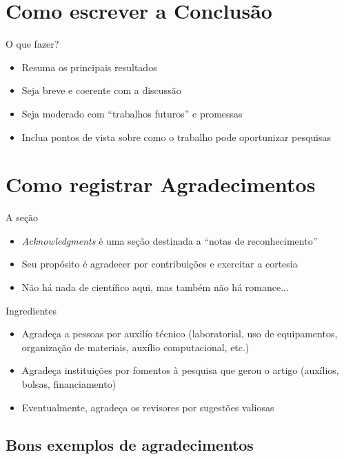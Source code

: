 \section{Como escrever a Conclusão}

\begin{frame}{O que fazer?}
\begin{itemize}
\item Resuma os principais resultados 
\item Seja breve e coerente com a discussão
\item Seja moderado com ``trabalhos futuros'' e promessas
\item Inclua pontos de vista sobre como o trabalho pode oportunizar pesquisas
\end{itemize}
\end{frame}


\section{Como registrar Agradecimentos}

\begin{frame}{A seção}
\begin{itemize}
\item \emph{Acknowledgments} é uma seção destinada a ``notas de reconhecimento''
\item Seu propósito é agradecer por contribuições e exercitar a cortesia
\item Não há nada de científico aqui, mas também não há romance... 
\end{itemize}
\end{frame}

\begin{frame}{Ingredientes}
\begin{itemize}
\item Agradeça a pessoas por auxilío técnico (laboratorial, uso de equipamentos, organização de materiais, auxílio computacional, etc.) 
\item Agradeça instituições por fomentos à pesquisa que gerou o artigo (auxílios, bolsas, financiamento)
\item Eventualmente, agradeça os revisores por sugestões valiosas
\end{itemize}
\end{frame}

\subsection{Bons exemplos de agradecimentos}

